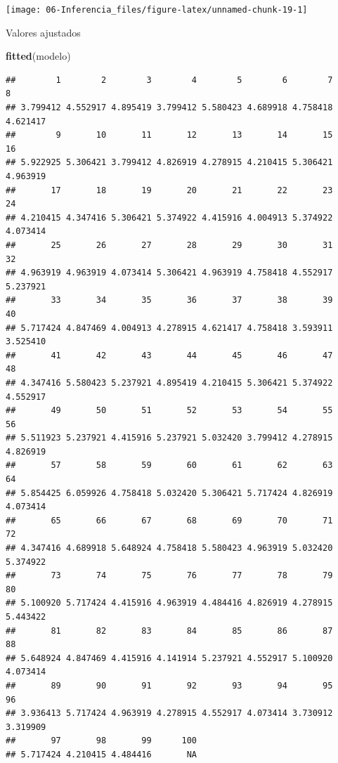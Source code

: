 \documentclass[]{book}
\newenvironment{Shaded}{\begin{snugshade}}{\end{snugshade}}
\newcommand{\KeywordTok}[1]{\textcolor[rgb]{0.13,0.29,0.53}{\textbf{#1}}}
\newcommand{\NormalTok}[1]{#1}
\begin{document}
\begin{center}\texttt{[image: 06-Inferencia\_files/figure-latex/unnamed-chunk-19-1]} \end{center}

Valores ajustados

\begin{Shaded}
\begin{Highlighting}[]
\KeywordTok{fitted}\NormalTok{(modelo)}
\end{Highlighting}
\end{Shaded}

\begin{verbatim}
##        1        2        3        4        5        6        7        8 
## 3.799412 4.552917 4.895419 3.799412 5.580423 4.689918 4.758418 4.621417 
##        9       10       11       12       13       14       15       16 
## 5.922925 5.306421 3.799412 4.826919 4.278915 4.210415 5.306421 4.963919 
##       17       18       19       20       21       22       23       24 
## 4.210415 4.347416 5.306421 5.374922 4.415916 4.004913 5.374922 4.073414 
##       25       26       27       28       29       30       31       32 
## 4.963919 4.963919 4.073414 5.306421 4.963919 4.758418 4.552917 5.237921 
##       33       34       35       36       37       38       39       40 
## 5.717424 4.847469 4.004913 4.278915 4.621417 4.758418 3.593911 3.525410 
##       41       42       43       44       45       46       47       48 
## 4.347416 5.580423 5.237921 4.895419 4.210415 5.306421 5.374922 4.552917 
##       49       50       51       52       53       54       55       56 
## 5.511923 5.237921 4.415916 5.237921 5.032420 3.799412 4.278915 4.826919 
##       57       58       59       60       61       62       63       64 
## 5.854425 6.059926 4.758418 5.032420 5.306421 5.717424 4.826919 4.073414 
##       65       66       67       68       69       70       71       72 
## 4.347416 4.689918 5.648924 4.758418 5.580423 4.963919 5.032420 5.374922 
##       73       74       75       76       77       78       79       80 
## 5.100920 5.717424 4.415916 4.963919 4.484416 4.826919 4.278915 5.443422 
##       81       82       83       84       85       86       87       88 
## 5.648924 4.847469 4.415916 4.141914 5.237921 4.552917 5.100920 4.073414 
##       89       90       91       92       93       94       95       96 
## 3.936413 5.717424 4.963919 4.278915 4.552917 4.073414 3.730912 3.319909 
##       97       98       99      100 
## 5.717424 4.210415 4.484416       NA
\end{verbatim}
\end{document}
